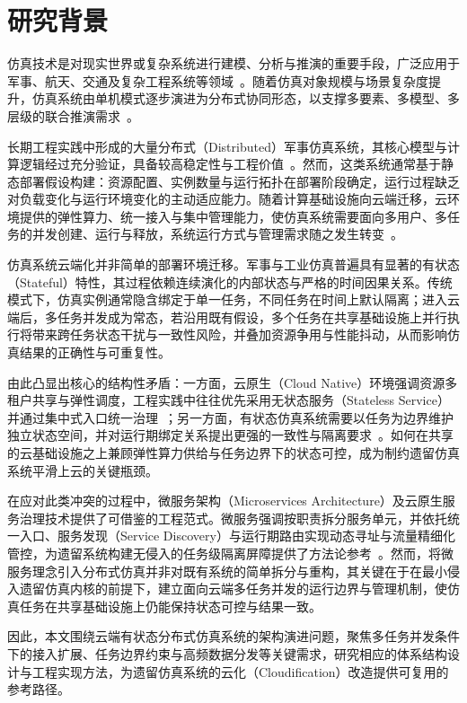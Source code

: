 \documentclass[lang=chs, degree=master, blindreview=true, winfonts=true, academic=false]{yanputhesis}
\begin{document}
\section{研究背景}

仿真技术是对现实世界或复杂系统进行建模、分析与推演的重要手段，广泛应用于军事、航天、交通及复杂工程系统等领域~\cite{WILCOX2000201,XTFZ202004011}。随着仿真对象规模与场景复杂度提升，仿真系统由单机模式逐步演进为分布式协同形态，以支撑多要素、多模型、多层级的联合推演需求~\cite{wang2011legacy,RISCOMARTIN2022102539,XTFZ202311001}。

长期工程实践中形成的大量分布式（Distributed）军事仿真系统，其核心模型与计算逻辑经过充分验证，具备较高稳定性与工程价值~\cite{910853}。然而，这类系统通常基于静态部署假设构建：资源配置、实例数量与运行拓扑在部署阶段确定，运行过程缺乏对负载变化与运行环境变化的主动适应能力。随着计算基础设施向云端迁移，云环境提供的弹性算力、统一接入与集中管理能力，使仿真系统需要面向多用户、多任务的并发创建、运行与释放，系统运行方式与管理需求随之发生转变~\cite{DANGELO2014320}。

仿真系统云端化并非简单的部署环境迁移。军事与工业仿真普遍具有显著的有状态（Stateful）特性，其过程依赖连续演化的内部状态与严格的时间因果关系。传统模式下，仿真实例通常隐含绑定于单一任务，不同任务在时间上默认隔离；进入云端后，多任务并发成为常态，若沿用既有假设，多个任务在共享基础设施上并行执行将带来跨任务状态干扰与一致性风险，并叠加资源争用与性能抖动，从而影响仿真结果的正确性与可重复性。

由此凸显出核心的结构性矛盾：一方面，云原生（Cloud Native）环境强调资源多租户共享与弹性调度，工程实践中往往优先采用无状态服务（Stateless Service）并通过集中式入口统一治理~\cite{electronics10040423}；另一方面，有状态仿真系统需要以任务为边界维护独立状态空间，并对运行期绑定关系提出更强的一致性与隔离要求~\cite{Dinh_Tuan_2025}。如何在共享的云基础设施之上兼顾弹性算力供给与任务边界下的状态可控，成为制约遗留仿真系统平滑上云的关键瓶颈。

在应对此类冲突的过程中，微服务架构（Microservices Architecture）及云原生服务治理技术提供了可借鉴的工程范式。微服务强调按职责拆分服务单元，并依托统一入口、服务发现（Service Discovery）与运行期路由实现动态寻址与流量精细化管控，为遗留系统构建无侵入的任务级隔离屏障提供了方法论参考~\cite{11029194}。然而，将微服务理念引入分布式仿真并非对既有系统的简单拆分与重构，其关键在于在最小侵入遗留仿真内核的前提下，建立面向云端多任务并发的运行边界与管理机制，使仿真任务在共享基础设施上仍能保持状态可控与结果一致。

因此，本文围绕云端有状态分布式仿真系统的架构演进问题，聚焦多任务并发条件下的接入扩展、任务边界约束与高频数据分发等关键需求，研究相应的体系结构设计与工程实现方法，为遗留仿真系统的云化（Cloudification）改造提供可复用的参考路径。
\end{document}
